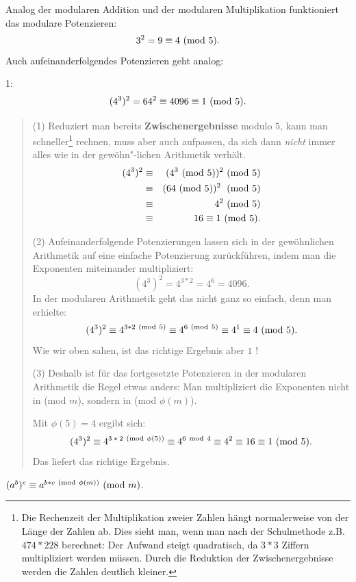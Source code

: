\begin{refsegment}
Analog der modularen Addition und der modularen Multiplikation funktioniert
das modulare Potenzieren:
$$ 3^2 = 9 \equiv 4 {\rm ~(mod~} 5). $$
Auch aufeinanderfolgendes Potenzieren geht analog:

\begin{example}{ 1:}
$$ (4^3)^2 = 64^2 \equiv 4096 \equiv 1 {\rm ~(mod~} 5). $$
\begin{quote}
(1) Reduziert man bereits \textbf{Zwischenergebnisse} modulo $5$, kann man
schneller\footnote{%
Die Rechenzeit der Multiplikation zweier Zahlen hängt normalerweise von der
Länge der Zahlen ab. Dies sieht man, wenn man nach der Schulmethode z.B.
$474*228$ berechnet: Der Aufwand steigt quadratisch, da $3*3$ Ziffern
multipliziert werden müssen. Durch die Reduktion der Zwischenergebnisse
werden die Zahlen deutlich kleiner.
} rechnen, muss aber auch aufpassen, da sich dann \textit{nicht} immer alles wie in der
gewöhn"-lichen Arithmetik verhält.
\begin{eqnarray*}
(4^3)^2 & \equiv & (4^3{\rm ~(mod~}5))^2{\rm ~(mod~}5) \nonumber\\
            & \equiv & (64{\rm ~(mod~}5))^2\;{\rm ~(mod~}5) \nonumber\\
            & \equiv & 4^2{\rm ~(mod~}5) \nonumber\\
            & \equiv & 16 \equiv 1 {\rm ~(mod~}5). \nonumber
\end{eqnarray*}

(2) Aufeinanderfolgende Potenzierungen lassen sich in der gewöhnlichen
Arithmetik auf eine einfache Potenzierung zurückführen, indem man die
Exponenten miteinander multipliziert:
$$ (4^3)^2 = 4^{3*2} = 4^6 = 4096. $$
In der modularen Arithmetik geht das nicht ganz so einfach, denn man erhielte:
$$ (4^3)^2 \equiv 4^{3*2{\rm ~(mod~}5)} \equiv 4^{6{\rm ~(mod~}5)} \equiv 4^1 \equiv 4{\rm ~(mod~}5). $$
Wie wir oben sahen, ist das richtige Ergebnis aber $1$ !

(3) Deshalb ist für das fortgesetzte Potenzieren in der modularen Arithmetik
die Regel etwas anders: Man multipliziert die Exponenten nicht in (mod $m$),
sondern in (mod $\phi(m)$).

Mit $\phi(5) = 4$ ergibt sich:
$$
(4^3)^2 \equiv 4^{3\:*\:2{\rm ~(mod~}\phi(5))} \equiv 4^{6{\rm ~mod~}4} \equiv 4^2 \equiv 16 \equiv 1 {\rm ~(mod~}5).
$$
Das liefert das richtige Ergebnis.
\end{quote}
\end{example}


\begin{satz}\label{thm-zth-pot}
$(a^b)^c \equiv a^{b*c{\rm ~(mod~}\phi(m))}{\rm ~(mod~}m)$.
\end{satz}


\end{refsegment}

